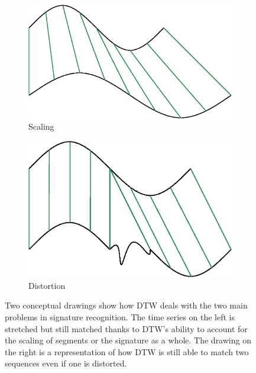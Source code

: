 \documentclass[a4paper, oneside]{csthesis}
\begin{document}
\begin{figure}
        \centering
        \begin{subfigure}[b]{0.30\textwidth}
                \centering
                \includegraphics[width=\textwidth]{figures/dtw-stretch.eps}
                \caption{Scaling}
                \label{fig:hmm1}
        \end{subfigure}%
        \quad
        \begin{subfigure}[b]{0.30\textwidth}
                \centering
                \includegraphics[width=\textwidth]{figures/dtw-distort.eps}
                \caption{Distortion}
                \label{fig:hmm1}
        \end{subfigure}%

        \caption{Two conceptual drawings show how DTW deals with the two main problems in signature recognition. The time series on the left is stretched but still matched thanks to DTW's ability to account for the scaling of segments or the signature as a whole. The drawing on the right is a representation of how DTW is still able to match two sequences even if one is distorted.}
        \label{fig:dtw-model}
\end{figure}
\end{document}
